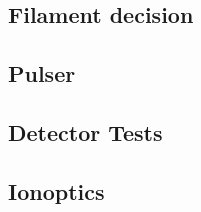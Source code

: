 	\subsection{Filament decision}

	\subsection{Pulser}
	
	
	
	
	\subsection{Detector Tests}
	
	
	\subsection{Ionoptics}
